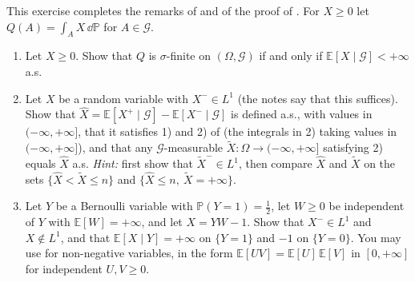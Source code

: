 \begin{exercise}\label{ex:ce-beyond-L1}
\hard This exercise completes the remarks of  and of
the proof of . For $X\ge0$ let $Q(A)=\int_AX\,\dd\mathbb P$ for
$A\in\mathcal G$.
\begin{enumerate}[label=(\alph*)]
  \item Let $X\ge0$. Show that $Q$ is $\sigma$-finite on $(\Omega,\mathcal G)$ if and only if
    $\mathbb E[X\mid\mathcal G]<+\infty$ a.s.
  \item Let $X$ be a random variable with $X^-\in L^1$ (the notes say that this suffices).
    Show that $\hat X=\mathbb E[X^+\mid\mathcal G]-\mathbb E[X^-\mid\mathcal G]$ is defined a.s.,
    with values in $(-\infty,+\infty]$, that it satisfies 1) and 2) of
     (the integrals in 2) taking values in
    $(-\infty,+\infty]$), and that any $\mathcal G$-measurable $\tilde X:\Omega\to(-\infty,+\infty]$
    satisfying 2) equals $\hat X$ a.s. \emph{Hint:} first show that $\tilde X^-\in L^1$, then
    compare $\hat X$ and $\tilde X$ on the sets $\{\hat X<\tilde X\le n\}$ and
    $\{\hat X\le n,\ \tilde X=+\infty\}$.
  \item Let $Y$ be a Bernoulli variable with $\mathbb P(Y=1)=\frac12$, let $W\ge0$ be independent of
    $Y$ with $\mathbb E[W]=+\infty$, and let $X=YW-1$. Show that $X^-\in L^1$ and
    $X\notin L^1$, and that $\mathbb E[X\mid Y]=+\infty$ on $\{Y=1\}$ and $-1$ on $\{Y=0\}$. You
    may use  for non-negative variables, in the form
    $\mathbb E[UV]=\mathbb E[U]\,\mathbb E[V]$ in $[0,+\infty]$ for independent $U,V\ge0$.
\end{enumerate}
\end{exercise}

